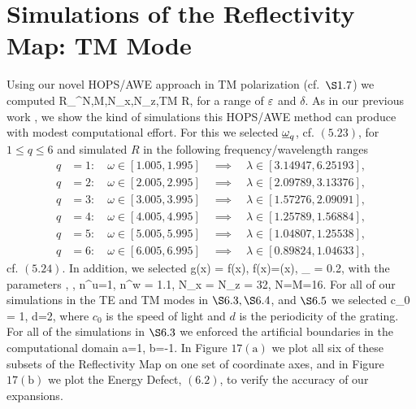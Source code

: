 \section{Simulations of the Reflectivity Map: TM Mode}
\label{Sec: Simulations TM Mode}

Using our novel HOPS/AWE approach in TM polarization (cf.~$\S 1.7$)
we computed
\bes
R_{}^{N,M,N_x,N_z,TM} \approx R,
\ees
for a range of $\varepsilon$ and $\delta$.
As in our previous work \cite{Nicholls16}, we show the kind of simulations
this HOPS/AWE method can produce with modest computational effort. For this
we selected $\underline{\omega}_q$, cf. $(5.23)$, for $1 \leq q \leq 6$ and
simulated $R$ in the following frequency/wavelength ranges
\begin{equation}
\begin{aligned}
q&=1:\quad \omega\in[1.005,1.995] \quad\implies\quad \lambda\in[3.14947,6.25193],\\
q&=2:\quad \omega\in[2.005,2.995] \quad\implies\quad\lambda\in[2.09789,3.13376],\\
q&=3:\quad \omega\in[3.005,3.995] \quad\implies\quad \lambda\in[1.57276,2.09091],\\
q&=4:\quad \omega\in[4.005,4.995] \quad\implies\quad \lambda\in[1.25789,1.56884],\\
q&=5:\quad \omega\in[5.005,5.995] \quad\implies\quad \lambda\in[1.04807,1.25538],\\
q&=6:\quad \omega\in[6.005,6.995] \quad\implies\quad \lambda\in[0.89824,1.04633],
\end{aligned}
\end{equation}
cf. $(5.24)$. In addition, we selected
\be
g(x) = \Eps f(x),
\quad
f(x)=\cos(x),
\quad
\varepsilon_{} = 0.2,
\ee
with the parameters
\be
{},
\quad
{},
\quad
n^u=1,
\quad
n^w = 1.1,
\quad N_x = N_z = 32,
\quad
N=M=16.
\ee
For all of our simulations in the TE and TM modes in $\S 6.3, \S 6.4$, and $\S 6.5$ we selected
\bes
c_0 = 1, \quad d=2\pi,
\ees
where $c_0$ is the speed of light and $d$ is the periodicity of the grating. For all of the simulations in $\S 6.3$ we enforced the artificial boundaries in the computational domain 
\bes
a=1,
\quad
b=-1.
\ees
In Figure $17(\text{a})$ we plot all six of these subsets of the 
Reflectivity Map on one set of coordinate axes, and in 
Figure $17(\text{b})$ we plot the Energy Defect,
$(6.2)$, to verify the accuracy of our expansions.
\vspace{-20mm}
%
